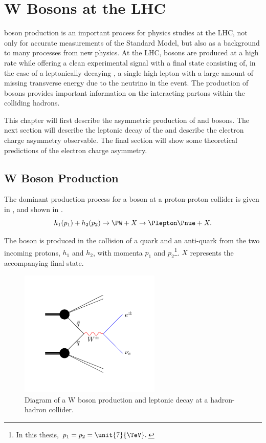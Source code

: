\chapter{W Bosons at the LHC}
\label{chap:wboson}

\PW boson production is an important process for physics studies at the LHC, not
only for accurate measurements of the Standard Model, but also as a background
to many processes from new physics. 
At the {LHC}, \PW bosons are produced at a high rate while offering a clean
experimental signal with a final state consisting of, in the case of a
leptonically decaying \PW, a single high \PT lepton with a large amount of
missing transverse energy due to the neutrino in the event. 
The production of \PW bosons provides important
information on the interacting partons within the colliding
hadrons\cite{catani,kom}.

This chapter will first describe the asymmetric production of \PWp and \PWm bosons.
The next section will describe the leptonic decay of the \PW and describe the electron
charge asymmetry observable. The final section will show some theoretical
predictions of the electron charge asymmetry.

\section{W Boson Production}

The dominant production process for a \PW boson at a proton-proton collider is
given in ,
and shown in . 
\begin{equation}
  h_1(p_1) + h_2(p_2)
  \to 
  \PW + X
  \to
  \Plepton \Pnue + X.
  \label{wbos:wprod}
\end{equation}

The \PW boson is produced in the collision of a quark and an anti-quark from the
two incoming protons, $h_1$ and $h_2$, with momenta $p_1$ and $p_2$\footnote{In
this thesis, $p_1 = p_2 = \unit{7}{\TeV}. $}.  $X$ represents the accompanying
final state.

\begin{figure}[htbp]
  \centering
  \includegraphics[width=0.6\textwidth]{w_production}
  \caption{Diagram of a W boson production and leptonic decay at a hadron-hadron collider.}
  \label{wbos:wproddiag}
\end{figure}

